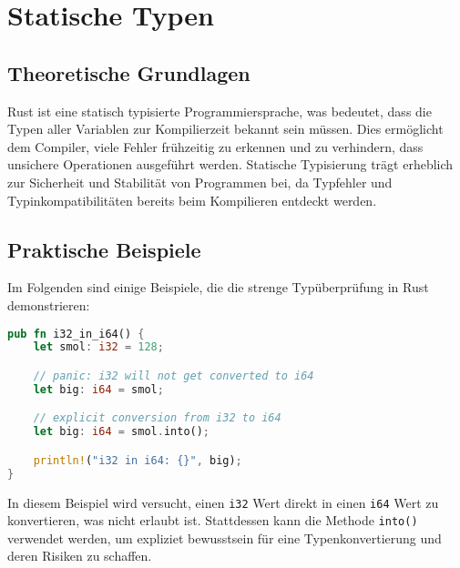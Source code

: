
\chapter{Statische Typen}

\section{Theoretische Grundlagen}

Rust ist eine statisch typisierte Programmiersprache, was bedeutet, dass die Typen aller Variablen zur Kompilierzeit bekannt sein müssen. 
Dies ermöglicht dem Compiler, viele Fehler frühzeitig zu erkennen und zu verhindern, dass unsichere Operationen ausgeführt werden. 
Statische Typisierung trägt erheblich zur Sicherheit und Stabilität von Programmen bei, da Typfehler und Typinkompatibilitäten bereits beim Kompilieren entdeckt werden.

\section{Praktische Beispiele}

Im Folgenden sind einige Beispiele, die die strenge Typüberprüfung in Rust demonstrieren:

\begin{lstlisting}[language=Rust, caption={i32 in i64}]
pub fn i32_in_i64() {
    let smol: i32 = 128;

    // panic: i32 will not get converted to i64
    let big: i64 = smol;

    // explicit conversion from i32 to i64 
    let big: i64 = smol.into();

    println!("i32 in i64: {}", big);
}
\end{lstlisting}

\noindent
In diesem Beispiel wird versucht, einen \texttt{i32} Wert direkt in einen \texttt{i64} Wert zu konvertieren, was nicht erlaubt ist. 
Stattdessen kann die Methode \texttt{into()} verwendet werden, um expliziet bewusstsein für eine Typenkonvertierung und deren Risiken zu schaffen.


